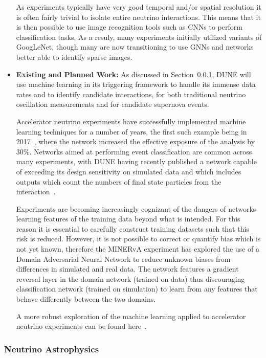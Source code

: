 \begin{itemize}
    As experiments typically have very good temporal and/or spatial resolution it is often fairly trivial to isolate entire neutrino interactions. This means that it is then possible to use image recognition tools such as CNNs to perform classification tasks. As a resuly, many experiments initially utilized variants of GoogLeNet, though many are now transitioning to use GNNs and networks better able to identify sparse images. 

    \item \textbf{Existing and Planned Work:} As discussed in Section~\ref{sec:nu_astro}, DUNE will use machine learning in its triggering framework to handle its immense data rates and to identify candidate interactions, for both traditional neutrino oscillation measurements and for candidate supernova events.
    
    Accelerator neutrino experiments have successfully implemented machine learning techniques for a number of years, the first such example being in 2017~\cite{Adamson_2017}, where the network increased the effective exposure of the analysis by 30\%. Networks aimed at performing event classification are common across many experiments, with DUNE having recently published a network capable of exceeding its design sensitivity on simulated data and which includes outputs which count the numbers of final state particles from the interaction~\cite{Abi_2020}.
    
    Experiments are becoming increasingly cognizant of the dangers of networks learning features of the training data beyond what is intended. For this reason it is essential to carefully construct training datasets such that this risk is reduced. However, it is not possible to correct or quantify bias which is not yet known, therefore the MINERvA experiment has explored the use of a Domain Adversarial Neural Network\cite{Perdue_2018} to reduce unknown biases from differences in simulated and real data. The network features a gradient reversal layer in the domain network (trained on data) thus  discouraging classification network (trained on simulation) to learn from any features that behave differently between the two domains.
    
    A more robust exploration of the machine learning applied to accelerator neutrino experiments can be found here~\cite{Psihas_2020}.

\end{itemize}

\subsubsection{Neutrino Astrophysics} \label{sec:nu_astro}

